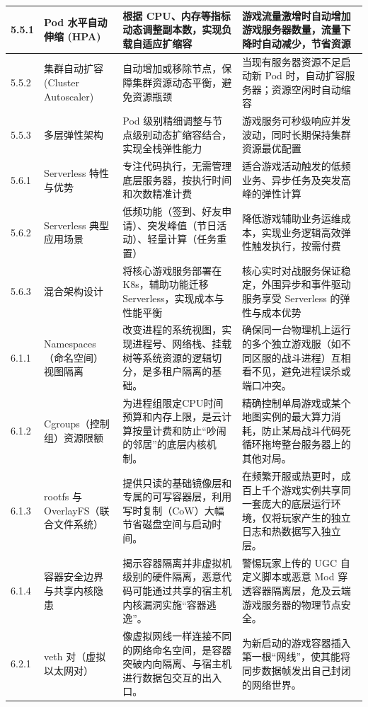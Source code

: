 \begin{longtable}{p{2.5cm}p{3cm}p{4.5cm}p{4.5cm}}
\hline
5.5.1 & Pod 水平自动伸缩 (HPA) & 根据 CPU、内存等指标动态调整副本数，实现负载自适应扩缩容 & 游戏流量激增时自动增加游戏服务器数量，流量下降时自动减少，节省资源 \\
\hline
5.5.2 & 集群自动扩容 (Cluster Autoscaler) & 自动增加或移除节点，保障集群资源动态平衡，避免资源瓶颈 & 当现有服务器资源不足启动新 Pod 时，自动扩容服务器；资源空闲时自动缩容 \\
\hline
5.5.3 & 多层弹性架构 & Pod 级别精细调整与节点级别动态扩缩容结合，实现全栈弹性能力 & 游戏服务可秒级响应并发波动，同时长期保持集群资源最优配置 \\
\hline
5.6.1 & Serverless 特性与优势 & 专注代码执行，无需管理底层服务器，按执行时间和次数精准计费 & 适合游戏活动触发的低频业务、异步任务及突发高峰的弹性计算 \\
\hline
5.6.2 & Serverless 典型应用场景 & 低频功能（签到、好友申请）、突发峰值（节日活动）、轻量计算（任务重置） & 降低游戏辅助业务运维成本，实现业务逻辑高效弹性触发执行，按需付费 \\
\hline
5.6.3 & 混合架构设计 & 将核心游戏服务部署在 K8s，辅助功能迁移 Serverless，实现成本与性能平衡 & 核心实时对战服务保证稳定，外围异步和事件驱动服务享受 Serverless 的弹性与成本优势 \\
\hline
6.1.1 & Namespaces（命名空间）视图隔离 & 改变进程的系统视图，实现进程号、网络栈、挂载树等系统资源的逻辑切分，是多租户隔离的基础。 & 确保同一台物理机上运行的多个独立游戏服（如不同区服的战斗进程）互相看不见，避免进程误杀或端口冲突。 \\
\hline
6.1.2 & Cgroups（控制组）资源限额 & 为进程组限定CPU时间预算和内存上限，是云计算按量计费和防止“吵闹的邻居”的底层内核机制。 & 精确控制单局游戏或某个地图实例的最大算力消耗，防止某局战斗代码死循环拖垮整台服务器上的其他对局。 \\
\hline
6.1.3 & rootfs 与 OverlayFS（联合文件系统） & 提供只读的基础镜像层和专属的可写容器层，利用写时复制（CoW）大幅节省磁盘空间与启动时间。 & 在频繁开服或热更时，成百上千个游戏实例共享同一套庞大的底层运行环境，仅将玩家产生的独立日志和热数据写入独立层。 \\
\hline
6.1.4 & 容器安全边界与共享内核隐患 & 揭示容器隔离并非虚拟机级别的硬件隔离，恶意代码可能通过共享的宿主机内核漏洞实施“容器逃逸”。 & 警惕玩家上传的 UGC 自定义脚本或恶意 Mod 穿透容器隔离层，危及云端游戏服务器的物理节点安全。 \\
\hline
6.2.1 & veth 对（虚拟以太网对） & 像虚拟网线一样连接不同的网络命名空间，是容器突破内向隔离、与宿主机进行数据包交互的出入口。 & 为新启动的游戏容器插入第一根“网线”，使其能将同步数据帧发出自己封闭的网络世界。 \\

\end{longtable}
